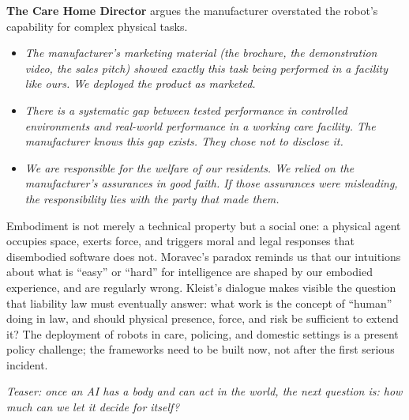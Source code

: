 \medskip
\noindent\textbf{The Care Home Director} argues the manufacturer overstated
    the robot's capability for complex physical tasks.
    \begin{itemize}
        \item \textit{The manufacturer's marketing material (the brochure,
        the demonstration video, the sales pitch) showed exactly this task
        being performed in a facility like ours. We deployed the product as
        marketed.}
        \item \textit{There is a systematic gap between tested performance
        in controlled environments and real-world performance in a working
        care facility. The manufacturer knows this gap exists. They chose
        not to disclose it.}
        \item \textit{We are responsible for the welfare of our residents.
        We relied on the manufacturer's assurances in good faith. If those
        assurances were misleading, the responsibility lies with the party
        that made them.}
    \end{itemize}


Embodiment is not merely a technical property but a social one: a physical agent occupies space,
exerts force, and triggers moral and legal responses that disembodied software does not. Moravec's
paradox reminds us that our intuitions about what is ``easy'' or ``hard'' for intelligence are shaped
by our embodied experience, and are regularly wrong. Kleist's dialogue makes visible the question
that liability law must eventually answer: what work is the concept of ``human'' doing in law, and
should physical presence, force, and risk be sufficient to extend it? The deployment of robots in
care, policing, and domestic settings is a present policy challenge; the frameworks need to be
built now, not after the first serious incident.

\medskip
\noindent\textit{Teaser: once an AI has a body and can act in the
world, the next question is: how much can we let it decide for
itself?}

\clearpage
